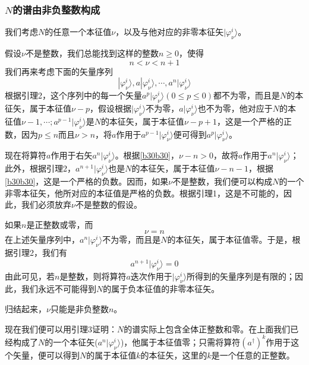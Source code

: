 \documentclass[]{article}
\begin{document}
\subsubsection{$N$的谱由非负整数构成}
我们考虑$N$的任意一个本征值$\nu$，以及与他对应的非零本征矢$|\varphi_\nu^i\rangle$。\par 
假设$\nu$不是整数，我们总能找到这样的整数$n\geqslant0$，使得
\begin{equation}
	n<\nu<n+1
	\label{b30b30}
\end{equation}
我们再来考虑下面的矢量序列
\begin{equation}
	|\varphi_\nu^i\rangle,a|\varphi_\nu^i\rangle,\cdots,a^n|\varphi_\nu^i\rangle
\end{equation}
根据引理2，这个序列中的每一个矢量$a^p|\varphi_\nu^i\rangle(0\leqslant p\leqslant0)$都不为零，而且是$N$的本征矢，属于本征值$\nu-p$，假设根据$|\varphi_\nu^i\rangle$不为零，$a|\varphi_\nu^i\rangle$也不为零，他对应于$N$的本征值$\nu-1,\cdots;a^{p-1}|\varphi_\nu^i\rangle$是$N$的本征矢，属于本征值$\nu-p+1$，这是一个严格的正数，因为$p\leqslant n$而且$\nu >n$，将$a$作用于$a^{p-1}|\varphi_\nu^i\rangle$便可得到$a^p|\varphi_\nu^i\rangle$。\par 
现在将算符$a$作用于右矢$a^n|\varphi_\nu^i\rangle$。根据\eqref{b30b30}，$\nu-n>0$，故将$a$作用于$a^n|\varphi_\nu^i\rangle$；此外，根据引理2，$a^{n+1}|\varphi_\nu^i\rangle$也是$N$的本征矢，属于本征值$\nu-n-1$，根据\eqref{b30b30}，这是一个严格的负数。因而，如果$\nu$不是整数，我们便可以构成$N$的一个非零本征矢，他所对应的本征值是严格的负数。根据引理1，这是不可能的，因此，我们必须放弃$\nu$不是整数的假设。\par
如果$n$是正整数或零，而
\begin{equation}
	\nu=n
\end{equation}
在上述矢量序列中，$a^n|\varphi_\nu^i\rangle$不为零，而且是$N$的本征矢，属于本征值零。于是，根据引理2，我们有
\begin{equation}
	a^{n+1}|\varphi_\nu^i\rangle=0
\end{equation}
由此可见，若$n$是整数，则将算符$a$迭次作用于$|\varphi_\nu^i\rangle$所得到的矢量序列是有限的；因此，我们永远不可能得到$N$的属于负本征值的非零本征矢。\par 
归结起来，$\nu$只能是非负整数$n$。\par 
现在我们便可以用引理3证明：$N$的谱实际上包含全体正整数和零。在上面我们已经构成了$N$的一个本征矢($a^n|\varphi_\nu^i\rangle$)，他属于本征值零；只需将算符$(a^\dagger)^k$作用于这个矢量，便可以得到$N$的属于本征值$k$的本征矢，这里的$k$是一个任意的正整数。\par 
\end{document}
